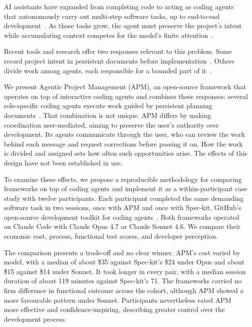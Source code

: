 
AI assistants have expanded from completing code to acting as coding agents that autonomously carry out multi-step software tasks, up to end-to-end development~\cite{liu2024llmagents}. As those tasks grow, the agent must preserve the project's intent while accumulating context competes for the model's finite attention~\cite{nliu2023lostmiddle}.

Recent tools and research offer two responses relevant to this problem. Some record project intent in persistent documents before implementation~\cite{delimarsky2025speckit}. Others divide work among agents, each responsible for a bounded part of it~\cite{hong2024metagpt}.

We present Agentic Project Management (APM), an open-source framework that operates on top of interactive coding agents and combines these responses: several role-specific coding agents execute work guided by persistent planning documents~\cite{chaidemenos2026apmrepo}. That combination is not unique. APM differs by making coordination user-mediated, aiming to preserve the user's authority over development. Its agents communicate through the user, who can review the work behind each message and request corrections before passing it on. How the work is divided and assigned sets how often such opportunities arise. The effects of this design have not been established in use.

To examine these effects, we propose a reproducible methodology for comparing frameworks on top of coding agents and implement it as a within-participant case study with twelve participants. Each participant completed the same demanding software task in two sessions, once with APM and once with Spec-kit, GitHub's open-source development toolkit for coding agents~\cite{github2026speckitdocs}. Both frameworks operated on Claude Code with Claude Opus 4.7 or Claude Sonnet 4.6. We compare their economic cost, process, functional test scores, and developer perception.

The comparison presents a trade-off and no clear winner. APM's cost varied by model, with a median of about \$35 against Spec-kit's \$24 under Opus and about \$15 against \$14 under Sonnet. It took longer in every pair, with a median session duration of about 119 minutes against Spec-kit's 71. The frameworks carried no firm difference in functional outcome across the cohort, although APM showed a more favourable pattern under Sonnet. Participants nevertheless rated APM more effective and confidence-inspiring, describing greater control over the development process.

